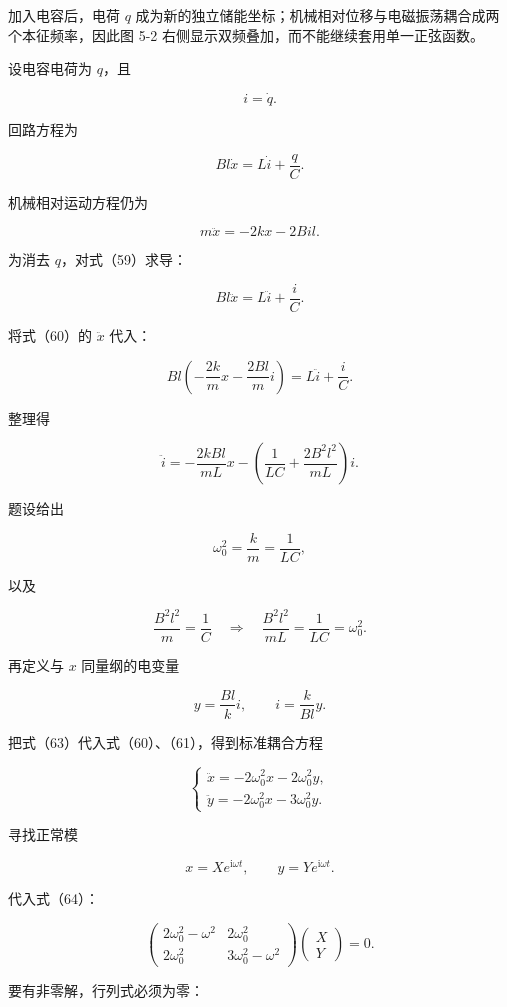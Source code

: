 \documentclass[12pt,a4paper,UTF8]{ctexart}
\begin{document}
加入电容后，电荷 \(q\)
成为新的独立储能坐标；机械相对位移与电磁振荡耦合成两个本征频率，因此图
5-2 右侧显示双频叠加，而不能继续套用单一正弦函数。

设电容电荷为 \(q\)，且

\[i=\dot q.\]

回路方程为

\[Bl\dot x=L\dot i+\frac qC. \tag{59}\]

机械相对运动方程仍为

\[m\ddot x=-2kx-2Bil. \tag{60}\]

为消去 \(q\)，对式（59）求导：

\[Bl\ddot x=L\ddot i+\frac iC.\]

将式（60）的 \(\ddot x\) 代入：

\[Bl\left(-\frac{2k}{m}x-\frac{2Bl}{m}i\right)
=L\ddot i+\frac iC.\]

整理得

\[\ddot i
=-\frac{2kBl}{mL}x
-\left(\frac1{LC}+\frac{2B^2l^2}{mL}\right)i. \tag{61}\]

题设给出

\[\omega_0^2=\frac{k}{m}=\frac1{LC},\]

以及

\[\frac{B^2l^2}{m}=\frac1C
\quad\Longrightarrow\quad
\frac{B^2l^2}{mL}=\frac1{LC}=\omega_0^2. \tag{62}\]

再定义与 \(x\) 同量纲的电变量

\[y=\frac{Bl}{k}i,
\qquad i=\frac{k}{Bl}y. \tag{63}\]

把式（63）代入式（60）、（61），得到标准耦合方程

\[\boxed{
\begin{cases}
\ddot x=-2\omega_0^2x-2\omega_0^2y,\\
\ddot y=-2\omega_0^2x-3\omega_0^2y.
\end{cases}}
\tag{64}\]

寻找正常模

\[x=Xe^{\mathrm i\omega t},\qquad
y=Ye^{\mathrm i\omega t}.\]

代入式（64）：

\[\begin{pmatrix}
2\omega_0^2-\omega^2&2\omega_0^2\\
2\omega_0^2&3\omega_0^2-\omega^2
\end{pmatrix}
\begin{pmatrix}X\\Y\end{pmatrix}=0.\]

要有非零解，行列式必须为零：
\end{document}
